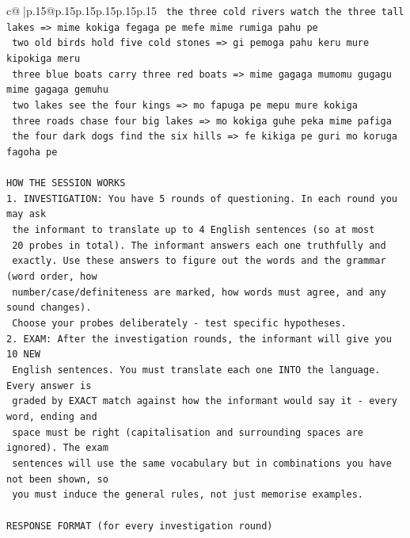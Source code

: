 \documentclass{article}
\begin{document}
{\begin{supertabular}{c@{$\;$}|p{.15\linewidth}@{}p{.15\linewidth}p{.15\linewidth}p{.15\linewidth}p{.15\linewidth}p{.15\linewidth}}
{{{\texttt{    the three cold rivers watch the three tall lakes  =>  mime kokiga fegaga pe mefe mime rumiga pahu pe} \\
\texttt{    two old birds hold five cold stones  =>  gi pemoga pahu keru mure kipokiga meru} \\
\texttt{    three blue boats carry three red boats  =>  mime gagaga mumomu gugagu mime gagaga gemuhu} \\
\texttt{    two lakes see the four kings  =>  mo fapuga pe mepu mure kokiga} \\
\texttt{    three roads chase four big lakes  =>  mo kokiga guhe peka mime pafiga} \\
\texttt{    the four dark dogs find the six hills  =>  fe kikiga pe guri mo koruga fagoha pe} \\
\\ 
\texttt{HOW THE SESSION WORKS} \\
\texttt{1. INVESTIGATION: You have 5 rounds of questioning. In each round you may ask} \\
\texttt{   the informant to translate up to 4 English sentences (so at most} \\
\texttt{   20 probes in total). The informant answers each one truthfully and} \\
\texttt{   exactly. Use these answers to figure out the words and the grammar (word order, how} \\
\texttt{   number/case/definiteness are marked, how words must agree, and any sound changes).} \\
\texttt{   Choose your probes deliberately {-} test specific hypotheses.} \\
\texttt{2. EXAM: After the investigation rounds, the informant will give you 10 NEW} \\
\texttt{   English sentences. You must translate each one INTO the language. Every answer is} \\
\texttt{   graded by EXACT match against how the informant would say it {-} every word, ending and} \\
\texttt{   space must be right (capitalisation and surrounding spaces are ignored). The exam} \\
\texttt{   sentences will use the same vocabulary but in combinations you have not been shown, so} \\
\texttt{   you must induce the general rules, not just memorise examples.} \\
\\ 
\texttt{RESPONSE FORMAT (for every investigation round)} \\
}}}
\end{supertabular}}
\end{document}
